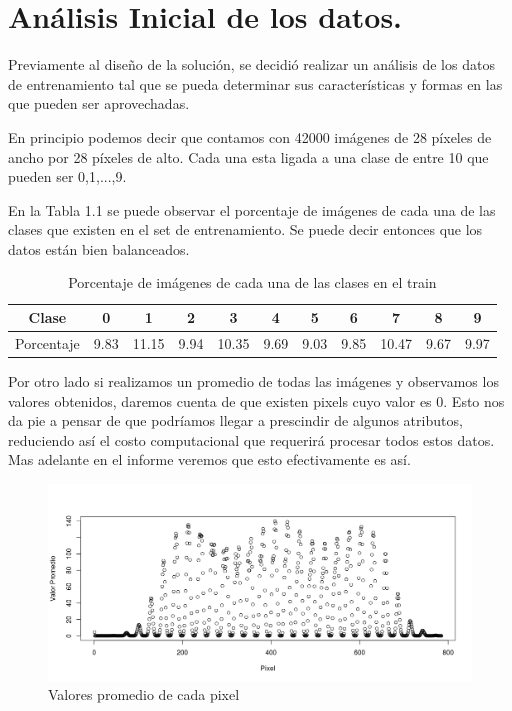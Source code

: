 \chapter{Análisis Inicial de los datos.}
Previamente al diseño de la solución, se decidió realizar un análisis de los datos de entrenamiento tal que se pueda determinar sus características y formas en las que pueden ser aprovechadas.

En principio podemos decir que contamos con 42000 imágenes de 28 píxeles de ancho por 28 píxeles de alto. Cada una esta ligada a una clase de entre 10 que pueden ser 0,1,...,9. 

En la Tabla 1.1 se puede observar el porcentaje de imágenes de cada una de las clases que existen en el set de entrenamiento. Se puede decir entonces que los datos están bien balanceados.

\begin{table}[htp]
  \caption{Porcentaje de imágenes de cada una de las clases en el train}
  \label{porc}

  \begin{center}
    \begin{tabular}{|c|c|c|c|c|c|c|c|c|c|c|}
    \hline
      Clase&0&1&2&3&4&5&6&7&8&9 \\
    \hline
      Porcentaje&9.83&11.15&9.94&10.35&9.69&9.03&9.85&10.47&9.67&9.97 \\
    \hline
    \end{tabular}
  \end{center}
\end{table}

Por otro lado si realizamos un promedio de todas las imágenes y observamos los valores obtenidos, daremos cuenta de que existen pixels cuyo valor es 0. Esto nos da pie a pensar de que podríamos llegar a prescindir de algunos atributos, reduciendo así el costo computacional que requerirá procesar todos estos datos. Mas adelante en el informe veremos que esto efectivamente es así.
\begin{figure}[htp]
  \begin{center}
    \includegraphics[width=15cm]{promImg.jpeg}
    \caption{Valores promedio de cada pixel}
    \label{promPix}
  \end{center}
\end{figure}
